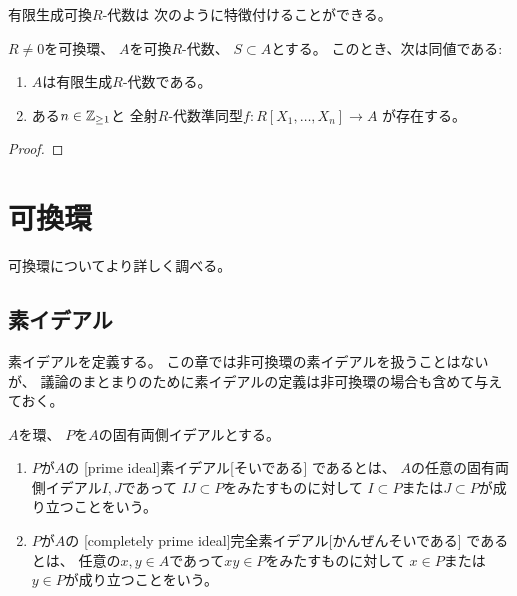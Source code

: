 \documentclass[report]{jlreq}
\begin{document}
有限生成可換$R$-代数は
次のように特徴付けることができる。

\begin{proposition}
    $R \neq 0$を可換環、
    $A$を可換$R$-代数、
    $S \subset A$とする。
    このとき、次は同値である:
    \begin{enumerate}
        \item $A$は有限生成$R$-代数である。
        \item ある$n \in \mathbb{Z}_{\ge 1}$と
            全射$R$-代数準同型$f \colon R[X_1, \dots, X_n] \to A$
            が存在する。
    \end{enumerate}
\end{proposition}

\begin{proof}
    \TODO{}
\end{proof}




%
\chapter{可換環}

可換環についてより詳しく調べる。

%
\section{素イデアル}

素イデアルを定義する。
この章では非可換環の素イデアルを扱うことはないが、
議論のまとまりのために素イデアルの定義は非可換環の場合も含めて与えておく。

\begin{definition}[素イデアル]
    $A$を環、
    $P$を$A$の固有両側イデアルとする。
    \begin{enumerate}
        \item $P$が$A$の
            [prime ideal]{素イデアル}[そいである]
            であるとは、
            $A$の任意の固有両側イデアル$I, J$であって
            $IJ \subset P$をみたすものに対して
            $I \subset P$または$J \subset P$が成り立つことをいう。
        \item $P$が$A$の
            [completely prime ideal]{完全素イデアル}[かんぜんそいである]
            であるとは、
            任意の$x, y \in A$であって$xy \in P$をみたすものに対して
            $x \in P$または$y \in P$が成り立つことをいう。
    \end{enumerate}
\end{definition}
\end{document}
